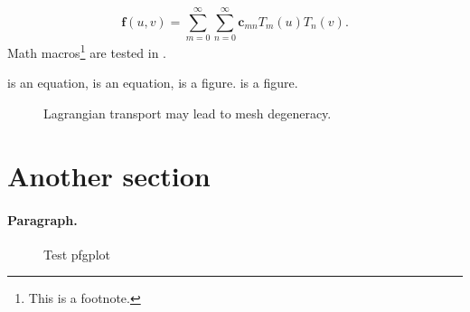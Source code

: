 \begin{equation}
	\boldsymbol{f}(u,v) = \sum_{m = 0}^\infty \sum_{n = 0}^\infty \boldsymbol{c}_{mn} T_m(u) T_n(v) .
\end{equation}
Math macros\footnote{This is a footnote.} are tested in .
\lipsum


 is an equation,  is an equation,  is a figure.  is a figure.

\begin{figure}
\centering
\caption{Lagrangian transport may lead to mesh degeneracy.}
\label{fig0}
\end{figure}


\section{Another section}
\paragraph{Paragraph.}

\begin{figure}
	\centering
	\caption{Test pfgplot}
\end{figure}


